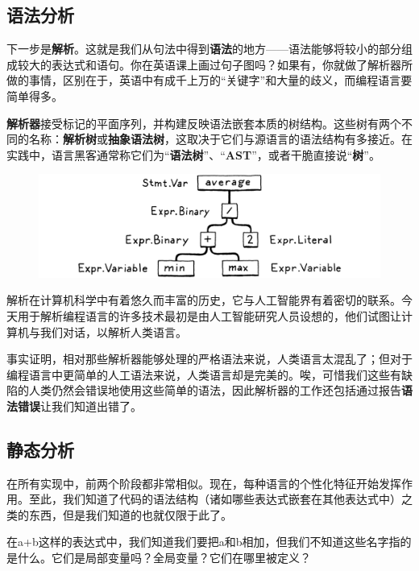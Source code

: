\documentclass[cn,11pt,chinese]{elegantbook}
\begin{document}
\subsection{语法分析}

下一步是\textbf{解析}。这就是我们从句法中得到\textbf{语法}的地方——语法能够将较小的部分组成较大的表达式和语句。你在英语课上画过句子图吗？如果有，你就做了解析器所做的事情，区别在于，英语中有成千上万的“关键字”和大量的歧义，而编程语言要简单得多。

\textbf{解析器}接受标记的平面序列，并构建反映语法嵌套本质的树结构。这些树有两个不同的名称：\textbf{解析树}或\textbf{抽象语法树}，这取决于它们与源语言的语法结构有多接近。在实践中，语言黑客通常称它们为“\textbf{语法树}”、“\textbf{AST}”，或者干脆直接说“\textbf{树}”。

\begin{figure}[htbp]
  \centering
  \includegraphics[width=\textwidth]{image/a-map-of-the-territory/ast.png}
\end{figure}

解析在计算机科学中有着悠久而丰富的历史，它与人工智能界有着密切的联系。今天用于解析编程语言的许多技术最初是由人工智能研究人员设想的，他们试图让计算机与我们对话，以解析人类语言。

事实证明，相对那些解析器能够处理的严格语法来说，人类语言太混乱了；但对于编程语言中更简单的人工语法来说，人类语言却是完美的。唉，可惜我们这些有缺陷的人类仍然会错误地使用这些简单的语法，因此解析器的工作还包括通过报告\textbf{语法错误}让我们知道出错了。

\subsection{静态分析}

在所有实现中，前两个阶段都非常相似。现在，每种语言的个性化特征开始发挥作用。至此，我们知道了代码的语法结构（诸如哪些表达式嵌套在其他表达式中）之类的东西，但是我们知道的也就仅限于此了。

在a+b这样的表达式中，我们知道我们要把a和b相加，但我们不知道这些名字指的是什么。它们是局部变量吗？全局变量？它们在哪里被定义？
\end{document}
